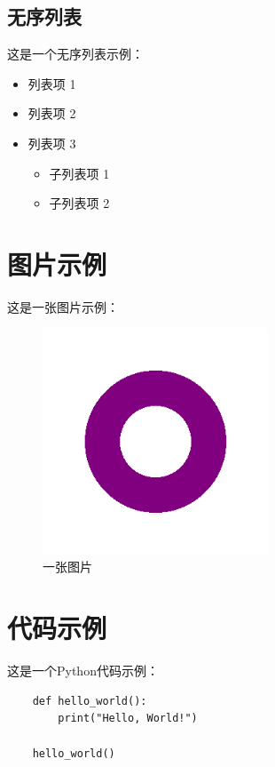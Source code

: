 \documentclass{ranfr}
\begin{document}
\subsection{无序列表}

这是一个无序列表示例：

\begin{itemize}
    \item 列表项 1
    \item 列表项 2
    \item 列表项 3
          \begin{itemize}
              \item 子列表项 1
              \item 子列表项 2
          \end{itemize}
\end{itemize}

\section{图片示例}

这是一张图片示例：

\begin{figure}[htbp]
    \centering
    \includegraphics[width=0.6\textwidth]{pictures/example.png}
    \caption{一张图片}
\end{figure}

\section{代码示例}

这是一个Python代码示例：

\begin{verbatim}
    def hello_world():
        print("Hello, World!")

    hello_world()
\end{verbatim}
\end{document}

